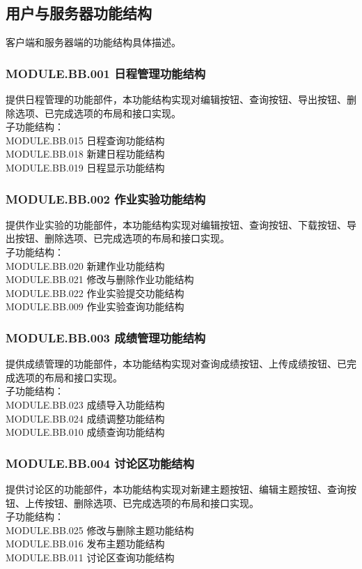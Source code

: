 \subsection{用户与服务器功能结构}

客户端和服务器端的功能结构具体描述。

\subsubsection{MODULE.BB.001    日程管理功能结构}
提供日程管理的功能部件，本功能结构实现对编辑按钮、查询按钮、导出按钮、删除选项、已完成选项的布局和接口实现。
\\子功能结构：
\\MODULE.BB.015 日程查询功能结构
\\MODULE.BB.018 新建日程功能结构
\\MODULE.BB.019 日程显示功能结构

\subsubsection{MODULE.BB.002    作业实验功能结构}
提供作业实验的功能部件，本功能结构实现对编辑按钮、查询按钮、下载按钮、导出按钮、删除选项、已完成选项的布局和接口实现。
\\子功能结构：
\\MODULE.BB.020 新建作业功能结构
\\MODULE.BB.021 修改与删除作业功能结构
\\MODULE.BB.022 作业实验提交功能结构
\\MODULE.BB.009 作业实验查询功能结构

\subsubsection{MODULE.BB.003    成绩管理功能结构}
提供成绩管理的功能部件，本功能结构实现对查询成绩按钮、上传成绩按钮、已完成选项的布局和接口实现。
\\子功能结构：
\\MODULE.BB.023 成绩导入功能结构
\\MODULE.BB.024 成绩调整功能结构
\\MODULE.BB.010 成绩查询功能结构


\subsubsection{MODULE.BB.004    讨论区功能结构}
提供讨论区的功能部件，本功能结构实现对新建主题按钮、编辑主题按钮、查询按钮、上传按钮、删除选项、已完成选项的布局和接口实现。
\\子功能结构：
\\MODULE.BB.025 修改与删除主题功能结构
\\MODULE.BB.016 发布主题功能结构
\\MODULE.BB.011 讨论区查询功能结构

